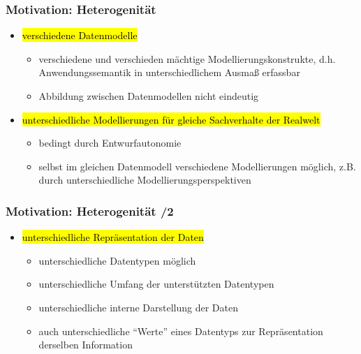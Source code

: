     
    \begin{frame}
    \frametitle{Motivation: Heterogenität}
    
    \begin{itemize}
    \item \hl{verschiedene Datenmodelle}
    \begin{itemize}
    \item verschiedene und verschieden mächtige Modellierungskonstrukte,
      d.h. Anwendungssemantik in unterschiedlichem Ausmaß erfassbar 
    \item Abbildung zwischen Datenmodellen nicht eindeutig
    \end{itemize}
    \item \hl{unterschiedliche Modellierungen für gleiche Sachverhalte der
        Realwelt}  
    \begin{itemize}
    \item bedingt durch Entwurfautonomie
    \item selbst im gleichen Datenmodell verschiedene Modellierungen
      möglich, z.B. durch unterschiedliche Modellierungsperspektiven 
    \end{itemize}
    \end{itemize}
    
    \end{frame}
    
    
    \begin{frame}
    \frametitle{Motivation: Heterogenität /2}
    
    \begin{itemize}
    \item \hl{unterschiedliche Repräsentation der Daten}
    \begin{itemize}
    \item unterschiedliche Datentypen möglich
    \item unterschiedliche Umfang der unterstützten Datentypen
    \item unterschiedliche interne Darstellung der Daten
    \item auch unterschiedliche "`Werte"' eines Datentyps zur
      Repräsentation derselben Information 
    \end{itemize}
    \end{itemize}
    
    \end{frame}
    
